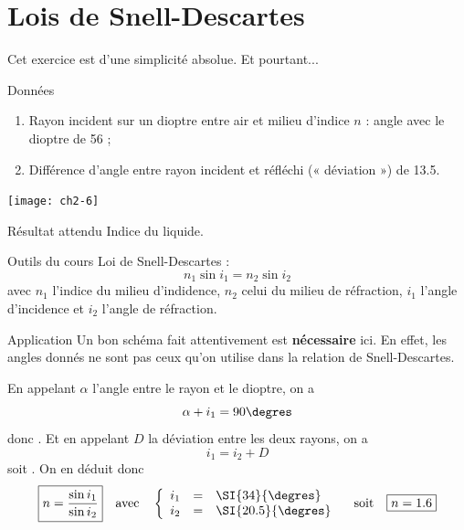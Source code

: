 \documentclass[../main/main.tex]{subfiles}
\begin{document}
\newpage

\section{Lois de Snell-Descartes}
Cet exercice est d'une simplicité absolue. Et pourtant...
\begin{tcbraster}[raster columns=5, raster equal height=rows]
    \begin{NCdefi}[raster multicolumn=3, sidebyside, righthand width=4cm]{Données}
        \begin{enumerate}
            \item Rayon incident sur un dioptre entre air et milieu d'indice $n$ :
                angle {\huge avec le dioptre} de \SI{56}{\degres} ;
            \item Différence d'angle entre rayon incident et réfléchi (« déviation
                ») de \SI{13.5}{\degres}.
        \end{enumerate}
        \tcblower
        \begin{center}
            \texttt{[image: ch2-6]}
        \end{center}
    \end{NCdefi}    
    \begin{tcolorbox}[blankest, raster multicolumn=2, space to=\myspace]
        \begin{tcbraster}[raster columns=1]
            \begin{NCprop}[add to natural height=\myspace]{Résultat attendu}
                Indice du liquide.
            \end{NCprop}
            \begin{NCdemo}{Outils du cours}
                Loi de Snell-Descartes :
                \[ n_1\sin i_1 = n_2 \sin i_2 \]
                avec $n_1$ l'indice du milieu d'indidence, $n_2$ celui du milieu
                de réfraction, $i_1$ l'angle d'incidence et $i_2$ l'angle de
                réfraction.
            \end{NCdemo}
        \end{tcbraster}
    \end{tcolorbox}
\end{tcbraster}

\begin{NCexem}{Application}
    Un bon schéma fait attentivement est \textbf{nécessaire} ici. En effet,
    les angles donnés ne sont pas ceux qu'on utilise dans la relation de
    Snell-Descartes. \bigbreak
    
    En appelant $\alpha$ l'angle entre le rayon et le dioptre, on a
    \[ \alpha + i_1 = 90\degres\]
    donc . Et en appelant $D$ la déviation entre
    les deux rayons, on a
    \[ i_1 = i_2 + D\]
    soit . On en déduit donc
    \[\boxed{n = \frac{\sin i_1}{\sin i_2}} \quad \text{avec} \quad
        \left\{
            \begin{array}{rcl}
                i_1 & = & \SI{34}{\degres}\\
                i_2 & = & \SI{20.5}{\degres}
            \end{array}
    \right. \quad \text{soit} \quad \boxed{n = 1.6}
    \]
\end{NCexem}
\end{document}
